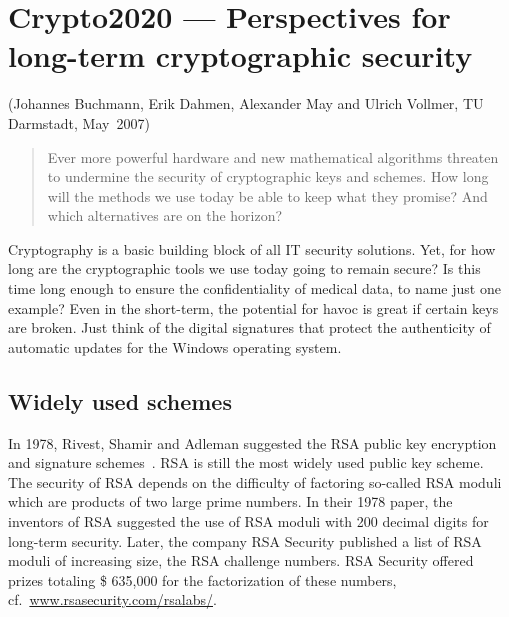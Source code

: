 
\newpage
\hypertarget{Chapter_Crypto2020}{}
\section{Crypto2020 --- Perspectives for long-term cryptographic
         security}
\label{Chapter_Crypto2020}
\begin{sloppypar}
(Johannes Buchmann, Erik Dahmen, Alexander May and Ulrich Vollmer, TU Darmstadt, May~2007)\\
\end{sloppypar}

\begin{abstract}Ever more powerful hardware and new
  mathematical algorithms threaten to undermine
  the security of cryptographic keys and schemes.
  How long will the methods we use today be able
  to keep what they promise?  And which
  alternatives are on the horizon?
\end{abstract}

Cryptography is a basic building block of all IT
security solutions.  Yet, for how long are the
cryptographic tools we use today going to remain
secure?  Is this time long enough to ensure the
confidentiality of medical data, to name just one
example?  Even in the short-term, the potential
for havoc is great if certain keys are broken.
Just think of the digital signatures that protect
the authenticity of automatic updates for the
Windows operating system.


\subsection{Widely used schemes}
\label{sec:the-weak}

In 1978, Rivest, Shamir and Adleman suggested the
RSA public key encryption and signature
schemes~\cite{rivest/shamir/adleman:1978}.  RSA is
still the most widely used public key scheme.  The
security of RSA depends on the difficulty of
factoring so-called RSA moduli which are products
of two large prime numbers.  In their 1978 paper,
the inventors of RSA suggested the use of RSA
moduli with 200 decimal digits for long-term
security.  Later, the company RSA Security
published a list of RSA moduli of increasing size,
the RSA challenge numbers.  RSA Security offered
prizes totaling \$ 635,000 for the factorization
of these numbers, cf.\
\url{www.rsasecurity.com/rsalabs/}.

